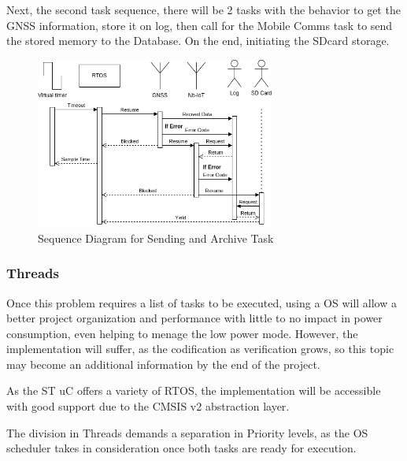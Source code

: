 Next, the second task sequence, there will be 2 tasks with the behavior to get the GNSS information, store it on log, then call for the Mobile Comms task to send the stored memory to the Database.
On the end, initiating the SDcard storage. 
\begin{figure}[H]
    \centering
    \includegraphics[width=0.7\textwidth]{images/diagrams/sequence_diagram/sequence_diagram_2/Sequence Diagram.drawio.png}  %
    \caption{Sequence Diagram for Sending and Archive Task}
    \label{fig:Sequence Diagram for Sending and Archive Task}        
\end{figure}

\subsubsection{Threads} 
Once this problem requires a list of tasks to be executed, using a OS will allow
a better project organization and performance with little to no impact in power consumption, 
even helping to menage the low power mode. However, the implementation will suffer, as the
codification as verification grows, so this topic may become an additional information 
by the end of the project.

As the ST uC offers a variety of RTOS, the implementation will be accessible with good support due to the
CMSIS v2 abstraction layer.

The division in Threads demands a separation in Priority levels, as the OS scheduler takes in consideration 
once both tasks are ready for execution.  

